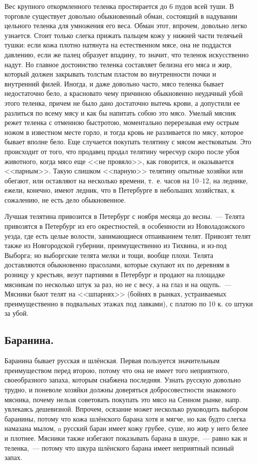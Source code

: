 Вес крупного откормленного теленка простирается до 6 пудов всей туши. В торговле существует довольно обыкновенный обман, состоящий в надувании цельного теленка для умножения его веса. Обман этот, впрочем, довольно легко узнается. Стоит только слегка прижать пальцем кожу у нижней части телячьей тушки: если кожа плотно натянута на естественном мясе, она не поддастся давлению, если же палец образует впадину, то значит, что теленок искусственно надут. Но главное достоинство теленка составляет белизна его мяса и жир, который должен закрывать толстым пластом во внутренности почки и внутренний филей. Иногда, и даже довольно часто, мясо теленка бывает недостаточно бело, а красновато чему причиною обыкновенно неудачный убой этого теленка, причем не было дано достаточно вытечь крови, а допустили ее разлиться по всему мясу и как бы напитать собою это мясо. Умелый мясник режет теленка с отменною быстротою, моментально перерезывая ему острым ножом в известном месте горло, и тогда кровь не разливается по мясу, которое бывает вполне бело. Еще случается покупать телятину с мясом жестковатым. Это происходит от того, что продавец продал телятину чересчур скоро после убоя животного, когда мясо еще <<не провяло>>, как говорится, и оказывается <<парным>>. Такую слишком <<парную>> телятину опытные хозяйки или обегают, или оставляют на несколько времени, т.~е. часов на 10–12, на леднике, ежели, конечно, имеют ледник, что в Петербурге в небольших хозяйствах, к сожалению, не есть дело обыкновенное.

Лучшая телятина привозится в Петербург с ноября месяца до весны.~--- Телята привозятся в Петербург из его окрестностей, в особенности из Новоладожского уезда, где есть целые волости, занимающиеся отпаиванием телят. Привозят телят также из Новгородской губернии, преимущественно из Тихвина, и из-под Выборга; но выборгские телята мелки и тощи, вообще плохи. Телята доставляются обыкновенно прасолами, которые скупают их по деревням в розницу у крестьян, везут партиями в Петербург и продают на площадке мясникам по несколько штук за раз, но не с весу, а на глаз и на ощупь.~--- Мясники бьют телят на <<шпарнях>> (бойнях в рынках, устраиваемых преимущественно в подвальных этажах под лавками), с платою по 10 к. со штуки за убой.

\subsection{Баранина.}
Баранина бывает русская и шлёнская. Первая пользуется значительным преимуществом перед второю, потому что она не имеет того неприятного, своеобразного запаха, которым снабжена последняя. Узнать русскую довольно трудно, и поневоле хозяйки должны доверяться добросовестности знакомого мясника, почему нельзя советовать покупать это мясо на Сенном рынке, напр. увлекаясь дешевизной. Впрочем, осязание может несколько руководить выбором баранины, потому что кожа шлёнского барана хотя и мягче, но как будто слегка намазана мылом, a русский баран имеет кожу грубее, суше, но жир у него белее и плотнее. Мясники также избегают показывать барана в шкуре,~--- равно как и теленка,~--- потому что шкура шлёнского барана имеет неприятный псиный запах.

